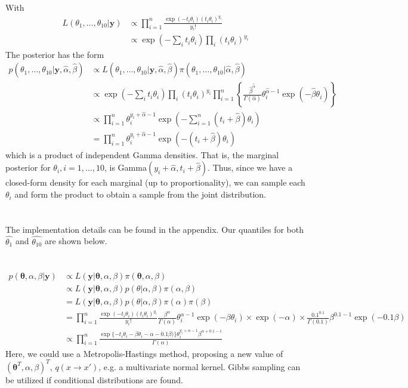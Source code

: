 \documentclass[11pt]{article}
\newcommand*\ba{\[ \begin{aligned}}
\newcommand*\ea{\end{aligned} \]}
\newcommand*\estim[1]{\widehat{#1}}
\newcommand*\by{\mathbf{y}}
\newcommand*\btheta{\boldsymbol{\theta}}
\renewcommand\;{\,}
\begin{document}
\section{}
With
\ba
L(\theta_1, \dotsc, \theta_{10} | \by)
	& \propto
		\prod_{i=1}^n
			\frac{\exp(-t_i \theta_i)(t_i \theta_i)^{y_i}}
			{ y_i! } \\
	& \propto \exp\left(-\sum_i t_i \theta_i\right)
		\prod_i (t_i \theta_i)^{y_i}
\ea
The posterior has the form
\ba
p(\theta_1, \dotsc, \theta_{10} | \by, \estim\alpha, \estim\beta)
	& \propto L(\theta_1, \dotsc, \theta_{10} | \by, \estim\alpha, \estim\beta) 
	\pi(\theta_1, \dotsc, \theta_{10} | \estim\alpha, \estim\beta) \\
	& \propto \exp\left(-\sum_i t_i \theta_i\right)
		\prod_i (t_i \theta_i)^{y_i}
		\prod_{i=1}^n \left\{
		\frac{\estim\beta^{\estim\alpha}}{\Gamma(\estim\alpha)}
		\theta_i^{\estim\alpha - 1}
		\exp\left(-\estim\beta \theta_i\right)
		\right\} \\
	& \propto \prod_{i=1}^n \theta_i^{y_i + \estim\alpha - 1}
		\exp\left(- \sum_{i=1}^n (t_i + \estim\beta) \theta_i \right) \\
	& = \prod_{i=1}^n
		\theta_i^{y_i + \estim\alpha - 1}
		\exp\left(-(t_i + \estim\beta) \theta_i\right)
\ea
which is a product of independent Gamma densities. That is, the marginal posterior for $\theta_i, i = 1, \dotsc, 10$, is 
Gamma$(y_i + \estim\alpha, t_i + \estim\beta)$. Thus, since we have a closed-form density for each marginal (up to proportionality), we can sample each $\theta_i$ and form the product to obtain a sample from the joint distribution.

\section{}
The implementation details can be found in the appendix.
Our quantiles for both $\estim{\theta_1}$ and $\estim{\theta_{10}}$ are shown below.


\section{}
\ba
p(\btheta, \alpha, \beta | \by)
	& \propto L(\by | \btheta, \alpha, \beta) \pi(\btheta, \alpha, \beta) \\
	& \propto L(\by | \btheta, \alpha, \beta) p(\theta | \alpha, \beta)
		\pi(\alpha, \beta) \\
	& = L(\by | \btheta, \alpha, \beta) p(\theta | \alpha, \beta)
		\pi(\alpha) \pi(\beta) \\
	& = \prod_{i=1}^n
		\frac{\exp(-t_i \theta_i)(t_i \theta_i)^{y_i}}{y_i!}
		\frac{\beta^\alpha}{\Gamma(\alpha)}
		\theta_i^{\alpha - 1} \exp(-\beta \theta_i)
		\times \exp(- \alpha)
		\times \frac{0.1^0.1}{\Gamma(0.1)} \beta^{0.1 - 1}
			\exp(-0.1 \beta) \\
	& \propto \boxed{ 
		\prod_{i=1}^n
		\frac{\exp\{-t_i \theta_i - \beta \theta_i 
		- \alpha - 0.1 \beta)\}
		\theta_i^{y_i + \alpha - 1}
		\beta^{\alpha + 0.1 - 1}}{\Gamma(\alpha)} }
\ea
Here, we could use a Metropolis-Hastings method, proposing a new value of  
$(\btheta^T, \alpha, \beta)^T$, $q(x \to x')$, e.g. a multivariate normal kernel.
Gibbs sampling can be utilized if conditional distributions are found.
\end{document}

